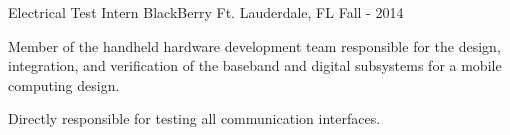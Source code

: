 \begin{cventries}
	\cventry
		{Electrical Test Intern} %
		{BlackBerry} %
		{Ft. Lauderdale, FL} %
		{Fall - 2014} %
		{
			\begin{cvitems} %
			\item {Member of the handheld hardware development team responsible for the design, integration, and verification of the baseband and digital subsystems for a mobile computing design.}
			\item {Directly responsible for testing all communication interfaces.}
			\end{cvitems}
		}
\end{cventries}
